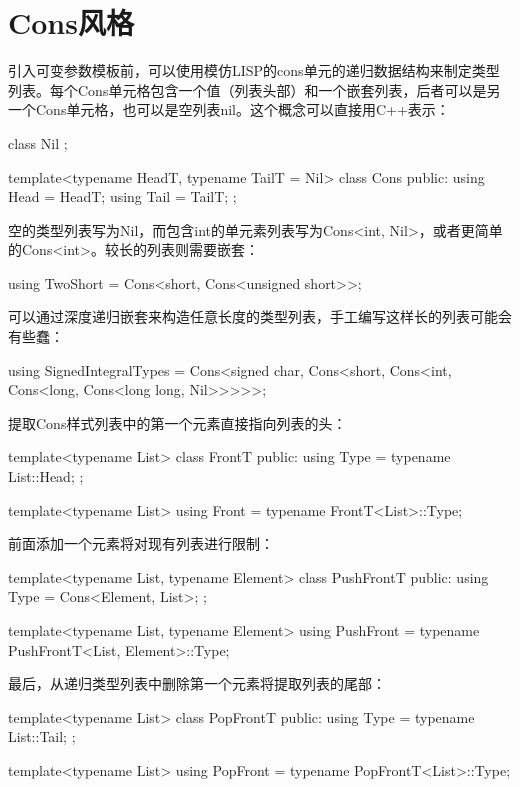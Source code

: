 \section{Cons风格}
引入可变参数模板前，可以使用模仿LISP的cons单元的递归数据结构来制定类型列表。每个Cons单元格包含一个值（列表头部）和一个嵌套列表，后者可以是另一个Cons单元格，也可以是空列表nil。这个概念可以直接用C++表示：

\begin{cpp}
class Nil { };

template<typename HeadT, typename TailT = Nil>
class Cons {
	public:
	using Head = HeadT;
	using Tail = TailT;
};
\end{cpp}

空的类型列表写为Nil，而包含int的单元素列表写为Cons<int, Nil>，或者更简单的Cons<int>。较长的列表则需要嵌套：

\begin{cpp}
using TwoShort = Cons<short, Cons<unsigned short>>;
\end{cpp}

可以通过深度递归嵌套来构造任意长度的类型列表，手工编写这样长的列表可能会有些蠢：

\begin{cpp}
using SignedIntegralTypes = Cons<signed char, Cons<short, Cons<int,
							Cons<long, Cons<long long, Nil>>>>>;
\end{cpp}

提取Cons样式列表中的第一个元素直接指向列表的头：

\begin{cpp}
template<typename List>
class FrontT {
	public:
	using Type = typename List::Head;
};

template<typename List>
using Front = typename FrontT<List>::Type;
\end{cpp}

前面添加一个元素将对现有列表进行限制：

\begin{cpp}
template<typename List, typename Element>
class PushFrontT {
	public:
	using Type = Cons<Element, List>;
};

template<typename List, typename Element>
using PushFront = typename PushFrontT<List, Element>::Type;
\end{cpp}

最后，从递归类型列表中删除第一个元素将提取列表的尾部：

\begin{cpp}
template<typename List>
class PopFrontT {
	public:
	using Type = typename List::Tail;
};

template<typename List>
using PopFront = typename PopFrontT<List>::Type;
\end{cpp}

